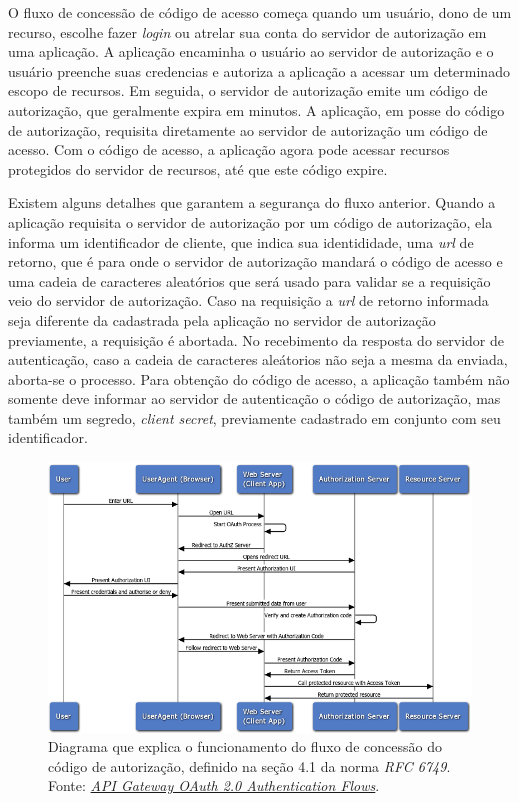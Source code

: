   O fluxo de concessão de código de acesso começa quando um usuário, dono de um recurso, escolhe 
  fazer \emph{login} ou atrelar sua conta do servidor de autorização em uma aplicação. A aplicação 
  encaminha o usuário ao servidor de autorização e o usuário preenche suas credencias  
  e autoriza a aplicação a acessar um determinado 
  escopo de recursos. Em seguida, o servidor de autorização emite um código de autorização, 
  que geralmente expira em minutos. A aplicação, em posse do código de autorização, requisita 
  diretamente ao servidor de autorização um código de acesso. Com o código de acesso, a aplicação agora 
  pode acessar recursos protegidos do servidor de recursos, até que este código expire.

  Existem alguns detalhes que garantem a segurança do fluxo anterior. Quando a aplicação requisita 
  o servidor de autorização por um código de autorização, ela informa um identificador de cliente, que 
  indica sua identididade, uma \emph{url} de retorno, que é para onde o servidor de autorização mandará 
  o código de acesso e uma cadeia de caracteres aleatórios que será usado para validar se a requisição 
  veio do servidor de autorização. Caso na requisição a \emph{url} de retorno informada seja diferente 
  da cadastrada pela aplicação no servidor de autorização previamente, a requisição é abortada. No 
  recebimento da resposta do servidor de autenticação, caso a cadeia de caracteres aleátorios não seja a mesma 
  da enviada, aborta-se o processo. Para obtenção do código de acesso, a aplicação também não somente deve informar 
  ao servidor de autenticação o código de autorização, mas também um segredo, \emph{client secret},
  previamente cadastrado em conjunto 
  com seu identificador.
  \begin{figure}[htpb]
    \centering
    \includegraphics[width=0.95\linewidth]{images/web_flow.png}
    \caption{Diagrama que explica o funcionamento do fluxo de concessão do código de autorização, 
      definido na seção 4.1 da norma \emph{RFC 6749}. Fonte: \hyperref[link:oauth]{\emph{API Gateway OAuth 2.0 Authentication Flows}}.}%
    \label{fig:web_flow}
  \end{figure}
  
